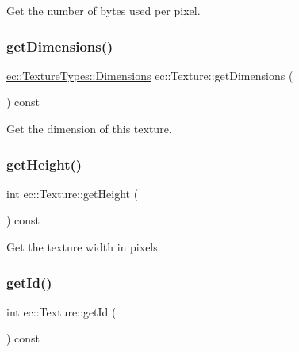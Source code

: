 Get the number of bytes used per pixel. 

\mbox{\label{classec_1_1_texture_a5d1e6d8dd6c98ea036caf2696e47637a}} 
\subsubsection{\texorpdfstring{get\+Dimensions()}{getDimensions()}}
{\footnotesize\ttfamily \mbox{\hyperlink{structec_1_1_texture_types_ac0e07f24452fa28dd8e6e33a224842fc}{ec\+::\+Texture\+Types\+::\+Dimensions}} ec\+::\+Texture\+::get\+Dimensions (\begin{DoxyParamCaption}{ }\end{DoxyParamCaption}) const}



Get the dimension of this texture. 

\mbox{\label{classec_1_1_texture_a45ff89dd7453c2d09ec10ba8aa58835c}} 
\subsubsection{\texorpdfstring{get\+Height()}{getHeight()}}
{\footnotesize\ttfamily int ec\+::\+Texture\+::get\+Height (\begin{DoxyParamCaption}{ }\end{DoxyParamCaption}) const}



Get the texture width in pixels. 

\mbox{\label{classec_1_1_texture_a0097b0b1826d7339ae109a187b6304d5}} 
\subsubsection{\texorpdfstring{get\+Id()}{getId()}}
{\footnotesize\ttfamily int ec\+::\+Texture\+::get\+Id (\begin{DoxyParamCaption}{ }\end{DoxyParamCaption}) const}




